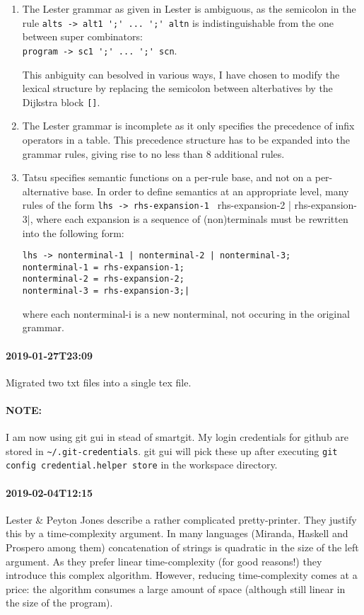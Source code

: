 \documentclass[11pt, a4paper]{article}
\begin{document}
\begin{enumerate}

\item The Lester grammar as given in Lester is ambiguous, as the semicolon in the rule 
\verb|alts -> alt1 ';' ... ';' altn|
is indistinguishable from the one between super combinators:\\
\verb|program -> sc1 ';' ... ';' scn|.

This anbiguity can besolved in various ways, I have chosen to modify the lexical structure by replacing the semicolon between alterbatives by the Dijkstra block \verb|[]|.

\item The Lester grammar is incomplete as it only specifies the precedence of infix operators in a table. This precedence structure has to be expanded into the grammar rules, giving rise to no less than 8 additional rules.

\item Tatsu specifies semantic functions on a per-rule base, and not on a per-alternative base. In order to define semantics at an appropriate level, many rules of the form
\verb|lhs -> rhs-expansion-1 | rhs-expansion-2 | rhs-expansion-3|, 
where each expansion is a sequence of (non)terminals must be rewritten into the following form:

\begin{Verbatim}
lhs -> nonterminal-1 | nonterminal-2 | nonterminal-3;
nonterminal-1 = rhs-expansion-1;
nonterminal-2 = rhs-expansion-2;
nonterminal-3 = rhs-expansion-3;|
\end{Verbatim}
where each nonterminal-i is a new nonterminal, not occuring in the original grammar.
\end{enumerate}

\paragraph{2019-01-27T23:09}
Migrated two txt files into a single tex file.

\paragraph{NOTE:}
I am now using git gui in stead of smartgit.
My login credentials for github are stored in \verb|~/.git-credentials|.
git gui will pick these up after executing \verb|git config credential.helper store| in the workspace directory.

\paragraph{2019-02-04T12:15}
Lester \& Peyton Jones describe a rather complicated pretty-printer.
They justify this by a time-complexity argument.
In many languages (Miranda, Haskell and Prospero among them) concatenation of strings is quadratic in the size of the left argument.
As they prefer linear time-complexity (for good reasons!) they introduce this complex algorithm.
However, reducing time-complexity comes at a price: the algorithm consumes a large amount of space (although still linear in the size of the program).
\end{document}
